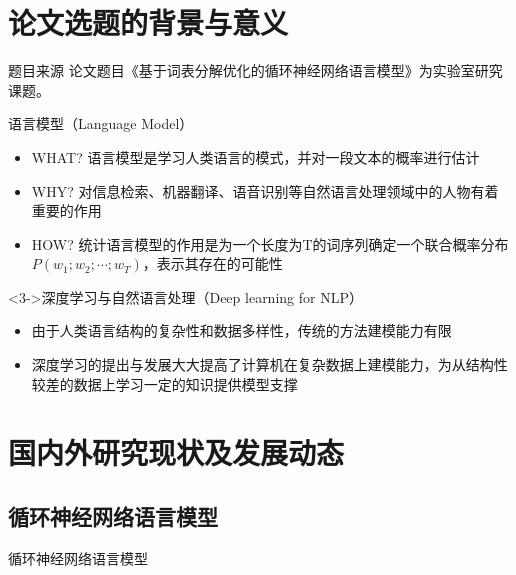 \documentclass[14pt]{Bredelebeamer}
\begin{document}
\section{论文选题的背景与意义}
\begin{frame}{题目来源}
  论文题目《基于词表分解优化的循环神经网络语言模型》为实验室研究课题。
  \pause
  \begin{alertblock}{语言模型（Language Model）}
    \begin{itemize}
      \item WHAT? 语言模型是学习人类语言的模式，并对一段文本的概率进行估计
      \item WHY? 对信息检索、机器翻译、语音识别等自然语言处理领域中的人物有着重要的作用
      \item HOW? 统计语言模型的作用是为一个长度为T的词序列确定一个联合概率分布$P(w_1;w_2; \cdots ;w_T)$，表示其存在的可能性
    \end{itemize}
  \end{alertblock}
  \pause
  \begin{block}<3->{深度学习与自然语言处理（Deep learning for NLP）}
    \begin{itemize}
      \item 由于人类语言结构的复杂性和数据多样性，传统的方法建模能力有限
      \item 深度学习的提出与发展大大提高了计算机在复杂数据上建模能力，为从结构性较差的数据上学习一定的知识提供模型支撑
    \end{itemize}
  \end{block}
\end{frame}

\section{国内外研究现状及发展动态}
\subsection{循环神经网络语言模型}
\begin{frame}{循环神经网络语言模型}
\begin{columns}
\begin{column}{.7\textwidth}

\end{column}

\begin{column}{.3\textwidth}
\end{column}
\end{columns}
\end{frame}
\end{document}
